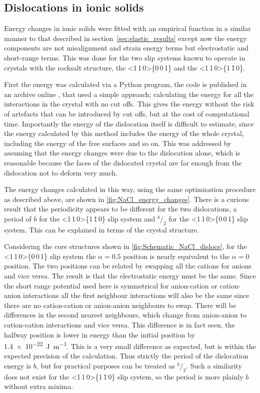 \FloatBarrier
\subsection{Dislocations in ionic solids}
\FloatBarrier


Energy changes in ionic solids were fitted with an empirical function in a similar manner to that described in section~\ref{sec:elastic_results} except now the energy components are not misalignment and strain energy terms but electrostatic and short-range terms. This was done for the two slip systems known to operate in crystals with the rocksalt structure, the <1\,1\,0>\{0\,0\,1\} and the <1\,1\,0>\{1\,\={1}\,0\}.


First the energy was calculated via a Python program, the code is published in an archive online \cite{code}, that used a simple approach; calculating the energy for all the interactions in the crystal with no cut offs. This gives the energy without the risk of artefacts that can be introduced by cut offs, but at the cost of computational time. Importantly the energy of the dislocation itself is difficult to estimate, since the energy calculated by this method includes the energy of the whole crystal, including the energy of the free surfaces and so on. This was addressed by assuming that the energy changes were due to the dislocation alone, which is reasonable because the faces of the dislocated crystal are far enough from the dislocation not to deform very much.


The energy changes calculated in this way, using the same optimisation procedure as described above, are shown in \ref{fig:NaCl_energy_changes}. There is a curious result that the periodicity appears to be different for the two dislocations, a period of $b$ for the <1\,1\,0>\{1\,\={1}\,0\} slip system and $^b\!/_2$ for the <1\,1\,0>\{0\,0\,1\} slip system. This can be explained in terms of the crystal structure. 

Considering the core structures shown in \autoref{fig:Schematic_NaCl_dislocs}, for the <1\,1\,0>\{0\,0\,1\} slip system the $\alpha=0.5$ position is nearly equivalent to the $\alpha=0$ position. The two positions can be related by swapping all the cations for anions and vice versa. The result is that the electrostatic energy must be the same. Since the short range potential used here is symmetrical for anion-cation or cation-anion interactions all the first neighbour interactions will also be the same since there are no cation-cation or anion-anion neighbours to swap. There will be differences in the second nearest neighbours, which change from anion-anion to cation-cation interactions and vice versa. This difference is in fact seen, the halfway position is lower in energy than the initial position by \SI{1.4e-22}{\joule\per\meter}. This is a very small difference as expected, but is within the expected precision of the calculation. Thus strictly the period of the dislocation energy is $b$, but for practical purposes can be treated as $^b\!/_2$. Such a similarity does not exist for the <1\,1\,0>\{1\,\={1}\,0\} slip system, so the period is more plainly $b$ without extra minima.





